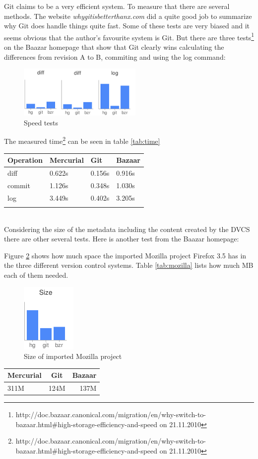 Git claims to be a very efficient system. To measure that there are several
methods. The website \emph{whygitisbetterthanx.com} did a quite good job to
summarize why Git does handle things quite fast.
Some of these tests are very biased and it seems obvious that the author's favourite system is Git. 
But there are three tests\footnote{http://doc.bazaar.canonical.com/migration/en/why-switch-to-bazaar.html\#high-storage-efficiency-and-speed on 21.11.2010} on the Baazar homepage that show that Git clearly wins 
calculating the differences from revision A to B, commiting and using the log command:

\begin{figure}[h]
  \centering
  \includegraphics{img/speed.png}
  \caption{Speed tests}
  \label{fig:Speedtests}  
\end{figure}

The measured time\footnote{http://doc.bazaar.canonical.com/migration/en/why-switch-to-bazaar.html\#high-storage-efficiency-and-speed on 21.11.2010} can be seen in table \ref{tab:time}\\

\begin{tabular}{ l || l | l | l }
Operation &	Mercurial &	Git & Bazaar \\
\hline
diff & 0.622s & 0.156s & 0.916s\\
commit & 1.126s & 0.348s & 1.030s\\
log & 3.449s & 0.402s & 3.205s\\
\label{tab:time}
\end{tabular}\\

Considering the size of the metadata including the content created by the DVCS there are other several tests. Here is another test from the Baazar homepage:

Figure \ref{fig:mozilla} shows how much space the imported Mozilla project Firefox 3.5 has in the three different version control systems. Table \ref{tab:mozilla} lists how much MB each of them needed.

\begin{figure}[h]
  \centering
  \includegraphics{img/size.png}
  \caption{Size of imported Mozilla project}
  \label{fig:mozilla}  
\end{figure}

\begin{center}
\begin{tabular}{ l | c | r }
Mercurial &	Git & Bazaar \\
\hline
311M & 124M & 137M
\end{tabular}
\label{tab:mozilla}
\end{center}


